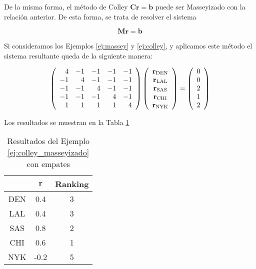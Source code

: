 De la misma forma, el método de Colley $\mathbf{C r} = \mathbf{b}$ puede ser Masseyizado con la relación anterior. De esta forma, se trata de resolver el sistema

\[ \mathbf{M r} = \mathbf{b} \]

\begin{ejemplo}\label{ej:colley_masseyizado}
Si consideramos los Ejemplos \ref{ej:massey} y \ref{ej:colley}, y aplicamos este método el sistema resultante queda de la siguiente manera:

\begin{equation*}
\left(\begin{array}{r r r r r}
 4 & -1 & -1 & -1 & -1\\
-1 &  4 & -1 & -1 & -1\\
-1 & -1 &  4 & -1 & -1\\
-1 & -1 & -1 &  4 & -1\\
 1 &  1 &  1 &  1 &  4
\end{array}\right)
\left(\begin{array}{c}
\mathbf{r}_{\text{DEN}}\\
\mathbf{r}_{\text{LAL}}\\
\mathbf{r}_{\text{SAS}}\\
\mathbf{r}_{\text{CHI}}\\
\mathbf{r}_{\text{NYK}}
\end{array}\right)
=
\left(\begin{array}{c}
0\\
0\\
2\\
1\\
2
\end{array}\right)
\end{equation*}

Los resultados se muestran en la Tabla \ref{tbl:colley_masseyizado}\\

\begin{table}[h]
\centering
\caption{Resultados del Ejemplo \ref{ej:colley_masseyizado} con empates}
\label{tbl:colley_masseyizado}
\begin{tabular}{@{}ccc@{}}
\cmidrule(l){2-3}
    & $\mathbf{r}$ & Ranking \\ \midrule
DEN &  0.4      & 3       \\
LAL &  0.4      & 3       \\
SAS &  0.8      & 2       \\
CHI &  0.6      & 1       \\
NYK & -0.2      & 5       \\ \bottomrule
\end{tabular}
\end{table}


\end{ejemplo}
